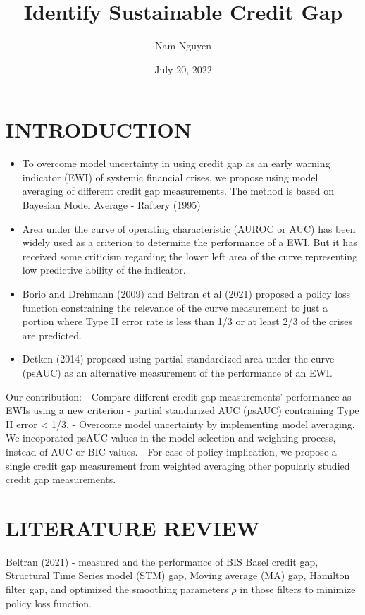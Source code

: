 \documentclass[
  12pt,
]{article}
\title{Identify Sustainable Credit Gap}
\author{Nam Nguyen}
\date{July 20, 2022}
\begin{document}
\maketitle

\hypertarget{introduction}{%
\section{INTRODUCTION}\label{introduction}}

\begin{itemize}
\item
  To overcome model uncertainty in using credit gap as an early warning indicator (EWI) of systemic financial crises, we propose using model averaging of different credit gap measurements. The method is based on Bayesian Model Average - Raftery (1995)
\item
  Area under the curve of operating characteristic (AUROC or AUC) has been widely used as a criterion to determine the performance of a EWI. But it has received some criticism regarding the lower left area of the curve representing low predictive ability of the indicator.
\item
  Borio and Drehmann (2009) and Beltran et al (2021) proposed a policy loss function constraining the relevance of the curve measurement to just a portion where Type II error rate is less than 1/3 or at least 2/3 of the crises are predicted.\\
\item
  Detken (2014) proposed using partial standardized area under the curve (psAUC) as an alternative measurement of the performance of an EWI.
\end{itemize}

Our contribution:
- Compare different credit gap measurements' performance as EWIs using a new criterion - partial standarized AUC (psAUC) contraining Type II error \textless{} 1/3.
- Overcome model uncertainty by implementing model averaging. We incoporated psAUC values in the model selection and weighting process, instead of AUC or BIC values.
- For ease of policy implication, we propose a single credit gap measurement from weighted averaging other popularly studied credit gap measurements.

\hypertarget{literature-review}{%
\section{LITERATURE REVIEW}\label{literature-review}}

Beltran (2021) - measured and the performance of BIS Basel credit gap, Structural Time Series model (STM) gap, Moving average (MA) gap, Hamilton filter gap, and optimized the smoothing parameters \(\rho\) in those filters to minimize policy loss function.
\end{document}
